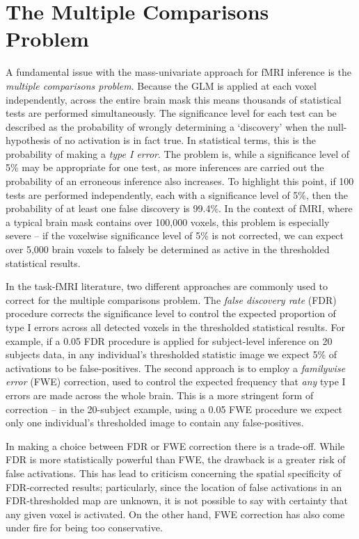 \section{The Multiple Comparisons Problem}

A fundamental issue with the mass-univariate approach for fMRI inference is the \textit{multiple comparisons problem}. Because the GLM is applied at each voxel independently, across the entire brain mask this means thousands of statistical tests are performed simultaneously. The significance level for each test can be described as the probability of wrongly determining a `discovery' when the null-hypothesis of no activation is in fact true. In statistical terms, this is the probability of making a \textit{type I error}. The problem is, while a significance level of 5\% may be appropriate for one test, as more inferences are carried out the probability of an erroneous inference also increases. To highlight this point, if 100 tests are performed independently, each with a significance level of 5\%, then the probability of at least one false discovery is 99.4\%. In the context of fMRI, where a typical brain mask contains over 100,000 voxels, this problem is especially severe -- if the voxelwise significance level of 5\% is not corrected, we can expect over 5,000 brain voxels to falsely be determined as active in the thresholded statistical results.

In the task-fMRI literature, two different approaches are commonly used to correct for the multiple comparisons problem. The \textit{false discovery rate} (FDR) procedure corrects the significance level to control the expected proportion of type I errors across all detected voxels in the thresholded statistical results. For example, if a 0.05 FDR procedure is applied for subject-level inference on 20 subjects data, in any individual's thresholded statistic image we expect 5\% of activations to be false-positives. The second approach is to employ a \textit{familywise error} (FWE) correction, used to control the expected frequency that \textit{any} type I errors are made across the whole brain. This is a more stringent form of correction -- in the 20-subject example, using a 0.05 FWE procedure we expect only one individual's thresholded image to contain any false-positives. 

In making a choice between FDR or FWE correction there is a trade-off. While FDR is more statistically powerful than FWE, the drawback is a greater risk of false activations. This has lead to criticism concerning the spatial specificity of FDR-corrected results; particularly, since the location of false activations in an FDR-thresholded map are unknown, it is not possible to say with certainty that any given voxel is activated. On the other hand, FWE correction has also come under fire for being too conservative.

